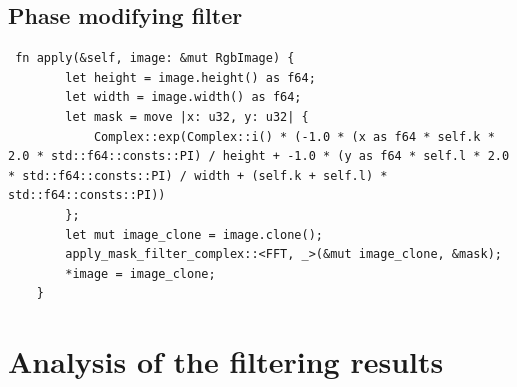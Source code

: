 \documentclass[12pt]{article}
\begin{document}
\subsection{Phase modifying filter}
\begin{lstlisting}
 fn apply(&self, image: &mut RgbImage) {
        let height = image.height() as f64;
        let width = image.width() as f64;
        let mask = move |x: u32, y: u32| {
            Complex::exp(Complex::i() * (-1.0 * (x as f64 * self.k * 2.0 * std::f64::consts::PI) / height + -1.0 * (y as f64 * self.l * 2.0 * std::f64::consts::PI) / width + (self.k + self.l) * std::f64::consts::PI))
        };
        let mut image_clone = image.clone();
        apply_mask_filter_complex::<FFT, _>(&mut image_clone, &mask);
        *image = image_clone;
    }
\end{lstlisting}

\section{Analysis of the filtering results}
\end{document}
